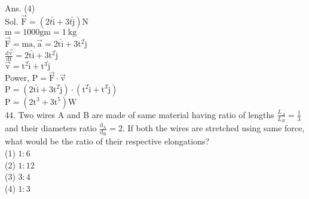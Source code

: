 \documentclass[10pt]{article}
\begin{document}
Ans. (4)\\
Sol. \(\overrightarrow{\mathrm{F}}=(2 t \hat{\mathrm{i}}+3 t \hat{\mathrm{j}}) \mathrm{N}\)\\
\(\mathrm{m}=1000 \mathrm{gm}=1 \mathrm{~kg}\)\\
\(\overrightarrow{\mathrm{F}}=\mathrm{ma}, \overrightarrow{\mathrm{a}}=2 \mathrm{t} \hat{\mathrm{i}}+3 \mathrm{t}^{2} \hat{\mathrm{j}}\)\\
\(\frac{\mathrm{d} \overrightarrow{\mathrm{v}}}{\mathrm{dt}}=2 \mathrm{t} \hat{\mathrm{i}}+3 \mathrm{t}^{2} \hat{\mathrm{j}}\)\\
\(\overrightarrow{\mathrm{v}}=\mathrm{t}^{2} \hat{\mathrm{i}}+\mathrm{t}^{3} \hat{\mathrm{j}}\)\\
Power, \(\mathrm{P}=\overrightarrow{\mathrm{F}} \cdot \overrightarrow{\mathrm{v}}\)\\
\(\mathrm{P}=\left(2 \mathrm{t} \hat{\mathrm{i}}+3 \mathrm{t}^{2} \hat{\mathrm{j}}\right) \cdot\left(\mathrm{t}^{2} \hat{\mathrm{i}}+\mathrm{t}^{3} \hat{\mathrm{j}}\right)\)\\
\(\mathrm{P}=\left(2 \mathrm{t}^{3}+3 \mathrm{t}^{5}\right) \mathrm{W}\)\\
44. Two wires A and B are made of same material having ratio of lengths \(\frac{L_{A}}{L_{B}}=\frac{1}{3}\) and their diameters ratio \(\frac{\mathrm{d}_{\mathrm{A}}}{\mathrm{d}_{\mathrm{B}}}=2\). If both the wires are stretched using same force, what would be the ratio of their respective elongations?\\
(1) \(1: 6\)\\
(2) \(1: 12\)\\
(3) \(3: 4\)\\
(4) \(1: 3\)
\end{document}
